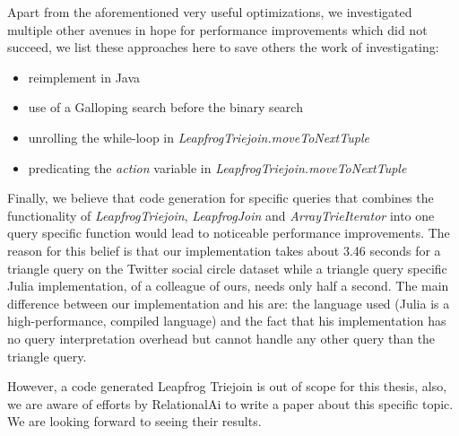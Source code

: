 Apart from the aforementioned very useful optimizations, we investigated multiple other avenues in hope for performance improvements
which did not succeed, we list these approaches here to save others the work of investigating:

\begin{itemize}
    \item reimplement in Java
    \item use of a Galloping search before the binary search
    \item unrolling the while-loop in \textit{LeapfrogTriejoin.moveToNextTuple}
    \item predicating the \textit{action} variable in \textit{LeapfrogTriejoin.moveToNextTuple}
\end{itemize}


Finally, we believe that code generation for specific queries that combines the functionality of \textit{LeapfrogTriejoin}, \textit{LeapfrogJoin}
and \textit{ArrayTrieIterator} into one query specific function would lead to noticeable performance improvements.
The reason for this belief is that our implementation takes about 3.46 seconds for a triangle query on the Twitter social circle dataset
while a triangle query specific Julia implementation, of a colleague of ours, needs only half a second.
The main difference between our implementation and his are: the language used (Julia is a high-performance, compiled language) and the fact
that his implementation has no query interpretation overhead but cannot handle any other query than the triangle query.

However, a code generated Leapfrog Triejoin is out of scope for this thesis, also, we are aware of efforts by RelationalAi to
write a paper about this specific topic.
We are looking forward to seeing their results.






